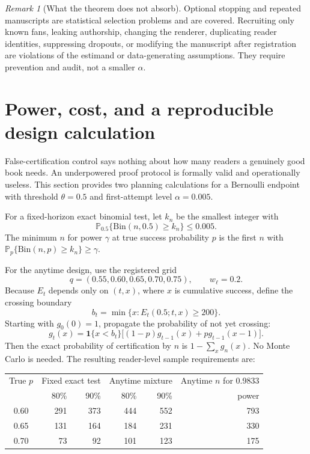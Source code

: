 \documentclass[11pt]{article}
\theoremstyle{remark}
\newtheorem{remark}{Remark}
\newcommand{\Prb}{\mathbb{P}}
\newcommand{\ind}{\mathbf{1}}
\begin{document}
\begin{remark}[What the theorem does not absorb]
Optional stopping and repeated manuscripts are statistical selection problems and are
covered. Recruiting only known fans, leaking authorship, changing the renderer, duplicating
reader identities, suppressing dropouts, or modifying the manuscript after registration are
violations of the estimand or data-generating assumptions. They require prevention and audit,
not a smaller $\alpha$.
\end{remark}

\section{Power, cost, and a reproducible design calculation}

False-certification control says nothing about how many readers a genuinely good book needs.
An underpowered proof protocol is formally valid and operationally useless. This section
provides two planning calculations for a Bernoulli endpoint with threshold $\theta=0.5$ and
first-attempt level $\alpha=0.005$.

For a fixed-horizon exact binomial test, let $k_n$ be the smallest integer with
\[
  \Prb_{0.5}\{\mathrm{Bin}(n,0.5)\geq k_n\}\leq0.005.
\]
The minimum $n$ for power $\gamma$ at true success probability $p$ is the first $n$ with
$\Prb_p\{\mathrm{Bin}(n,p)\geq k_n\}\geq\gamma$.

For the anytime design, use the registered grid
\[
  q=(0.55,0.60,0.65,0.70,0.75),\qquad w_\ell=0.2.
\]
Because $E_t$ depends only on $(t,x)$, where $x$ is cumulative success, define the crossing
boundary
\[
 b_t=\min\{x:E_t(0.5;t,x)\geq200\}.
\]
Starting with $g_0(0)=1$, propagate the probability of not yet crossing:
\[
 g_t(x)=\ind\{x<b_t\}\bigl[(1-p)g_{t-1}(x)+p g_{t-1}(x-1)\bigr].
\]
Then the exact probability of certification by $n$ is $1-\sum_x g_n(x)$. No Monte Carlo is
needed. The resulting reader-level sample requirements are:

\begin{center}
\small
\begin{tabular}{c rr rr r}
\toprule
True $p$ & \multicolumn{2}{c}{Fixed exact test} & \multicolumn{2}{c}{Anytime mixture} &
Anytime $n$ for 0.9833 \\
 & 80\% & 90\% & 80\% & 90\% & power \\
\midrule
0.60 & 291 & 373 & 444 & 552 & 793 \\
0.65 & 131 & 164 & 184 & 231 & 330 \\
0.70 & 73  & 92  & 101 & 123 & 175 \\
\bottomrule
\end{tabular}
\end{center}
\end{document}
